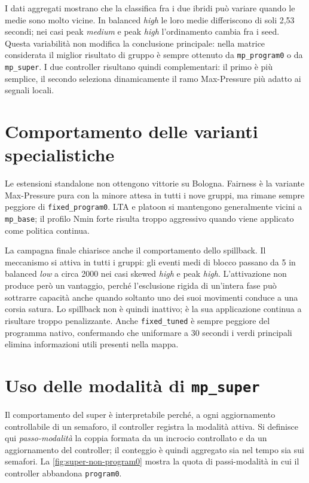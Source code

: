 \documentclass[12pt,a4paper,oneside]{report}
\numberwithin{equation}{chapter}
\begin{document}
I dati aggregati mostrano che la classifica fra i due ibridi può variare quando
le medie sono molto vicine. In balanced \emph{high} le loro medie differiscono di soli
2,53 secondi; nei casi peak \emph{medium} e peak \emph{high} l'ordinamento cambia fra i seed.
Questa variabilità non modifica la conclusione principale: nella matrice
considerata il miglior risultato di gruppo è sempre ottenuto da
\texttt{mp\_program0} o da \texttt{mp\_super}. I due controller risultano quindi
complementari: il primo è più semplice, il secondo seleziona dinamicamente il
ramo Max-Pressure più adatto ai segnali locali.

\section{Comportamento delle varianti specialistiche}

Le estensioni standalone non ottengono vittorie su Bologna. Fairness è la
variante Max-Pressure pura con la minore attesa in tutti i nove gruppi, ma
rimane sempre peggiore di \texttt{fixed\_program0}. LTA e platoon si
mantengono generalmente vicini a \texttt{mp\_base}; il profilo Nmin forte
risulta troppo aggressivo quando viene applicato come politica continua.

La campagna finale chiarisce anche il comportamento dello spillback. Il
meccanismo si attiva in tutti i gruppi: gli eventi medi di blocco passano da 5
in balanced \emph{low} a circa 2000 nei casi skewed \emph{high} e peak \emph{high}. L'attivazione
non produce però un vantaggio, perché l'esclusione rigida di un'intera fase può
sottrarre capacità anche quando soltanto uno dei suoi movimenti conduce a una
corsia satura. Lo spillback non è quindi inattivo; è la sua applicazione
continua a risultare troppo penalizzante. Anche \texttt{fixed\_tuned} è
sempre peggiore del programma nativo, confermando che uniformare a 30 secondi i
verdi principali elimina informazioni utili presenti nella mappa.

\section{Uso delle modalità di \texttt{mp\_super}}

Il comportamento del super è interpretabile perché, a ogni aggiornamento
controllabile di un semaforo, il controller registra la modalità attiva. Si
definisce qui \emph{passo-modalità} la coppia formata da un incrocio controllato
e da un aggiornamento del controller; il conteggio è quindi aggregato sia nel
tempo sia sui semafori. La \cref{fig:super-non-program0} mostra la quota di
passi-modalità in cui il controller abbandona \texttt{program0}.
\end{document}
